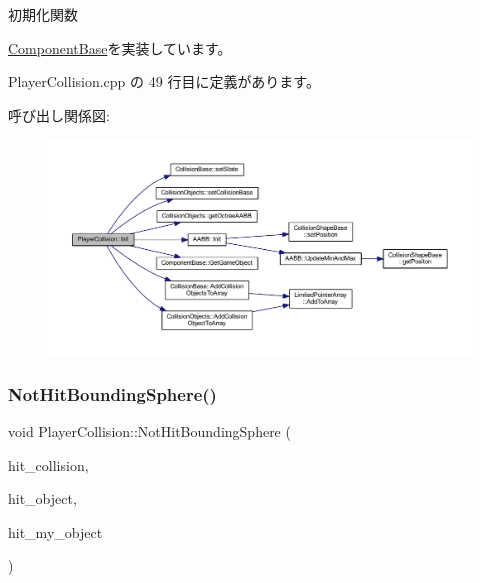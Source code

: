 初期化関数 



\mbox{\hyperlink{class_component_base_a125939d6befe42f28886a6523e86b18b}{Component\+Base}}を実装しています。



 Player\+Collision.\+cpp の 49 行目に定義があります。

呼び出し関係図\+:\nopagebreak
\begin{figure}[H]
\begin{center}
\leavevmode
\includegraphics[width=350pt]{class_player_collision_a3dd6238b75933fd60aee77e92353cc44_cgraph}
\end{center}
\end{figure}
\mbox{\label{class_player_collision_adce9e2df2361cadba7bbe397810a1893}} 
\subsubsection{\texorpdfstring{Not\+Hit\+Bounding\+Sphere()}{NotHitBoundingSphere()}}
{\footnotesize\ttfamily void Player\+Collision\+::\+Not\+Hit\+Bounding\+Sphere (\begin{DoxyParamCaption}\item[{\mbox{\hyperlink{class_collision_base}{Collision\+Base}} $\ast$}]{hit\+\_\+collision,  }\item[{\mbox{\hyperlink{class_collision_object}{Collision\+Object}} $\ast$}]{hit\+\_\+object,  }\item[{\mbox{\hyperlink{class_collision_object}{Collision\+Object}} $\ast$}]{hit\+\_\+my\+\_\+object }\end{DoxyParamCaption})\hspace{0.3cm}{\ttfamily [private]}}



